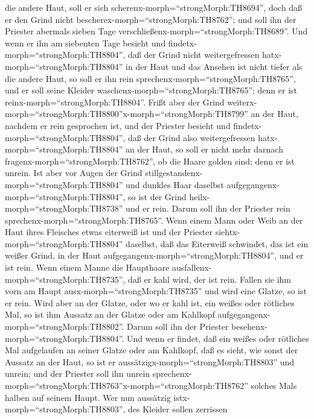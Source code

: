 die andere Haut,  soll er sich
scherenx-morph=``strongMorph:TH8694'', doch daß er den Grind nicht
bescherex-morph=``strongMorph:TH8762''; und soll ihn der Priester
abermals sieben Tage verschließenx-morph=``strongMorph:TH8689''.
 Und wenn er ihn am siebenten Tage besieht und
findetx-morph=``strongMorph:TH8804'', daß der Grind nicht
weitergefressen hatx-morph=``strongMorph:TH8804'' in der Haut und das
Ansehen ist nicht tiefer als die andere Haut, so soll er ihn rein
sprechenx-morph=``strongMorph:TH8765'', und er soll seine Kleider
waschenx-morph=``strongMorph:TH8765''; denn er ist
reinx-morph=``strongMorph:TH8804''.  Frißt aber der Grind
weiterx-morph=``strongMorph:TH8800''x-morph=``strongMorph:TH8799'' an
der Haut, nachdem er rein gesprochen ist,  und der Priester
besieht und findetx-morph=``strongMorph:TH8804'', daß der Grind also
weitergefressen hatx-morph=``strongMorph:TH8804'' an der Haut, so soll
er nicht mehr darnach fragenx-morph=``strongMorph:TH8762'', ob die Haare
golden sind; denn er ist unrein.  Ist aber vor Augen der
Grind stillgestandenx-morph=``strongMorph:TH8804'' und dunkles Haar
daselbst aufgegangenx-morph=``strongMorph:TH8804'', so ist der Grind
heilx-morph=``strongMorph:TH8738'' und er rein. Darum soll ihn der
Priester rein sprechenx-morph=``strongMorph:TH8765''.  Wenn
einem Mann oder Weib an der Haut ihres Fleisches etwas eiterweiß ist
 und der Priester siehtx-morph=``strongMorph:TH8804''
daselbst, daß das Eiterweiß schwindet, das ist ein weißer Grind, in der
Haut aufgegangenx-morph=``strongMorph:TH8804'', und er ist rein.
 Wenn einem Manne die Haupthaare
ausfallenx-morph=``strongMorph:TH8735'', daß er kahl wird, der ist rein.
 Fallen sie ihm vorn am Haupt
ausx-morph=``strongMorph:TH8735'' und wird eine Glatze, so ist er rein.
 Wird aber an der Glatze, oder wo er kahl ist, ein weißes
oder rötliches Mal, so ist ihm Aussatz an der Glatze oder am Kahlkopf
aufgegangenx-morph=``strongMorph:TH8802''.  Darum soll ihn
der Priester besehenx-morph=``strongMorph:TH8804''. Und wenn er findet,
daß ein weißes oder rötliches Mal aufgelaufen an seiner Glatze oder am
Kahlkopf, daß es sieht, wie sonst der Aussatz an der Haut, 
so ist er aussätzigx-morph=``strongMorph:TH8803'' und unrein; und der
Priester soll ihn unrein
sprechenx-morph=``strongMorph:TH8763''x-morph=``strongMorph:TH8762''
solches Mals halben auf seinem Haupt.  Wer nun aussätzig
istx-morph=``strongMorph:TH8803'', des Kleider sollen zerrissen
